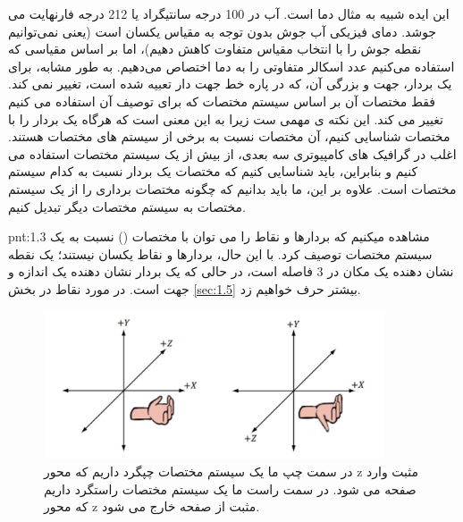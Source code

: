{\begin{spacing}{1.5}
        این ایده شبیه به مثال دما است. آب در 100 درجه سانتیگراد یا 212 درجه فارنهایت می جوشد.
        دمای فیزیکی آب جوش بدون توجه به مقیاس یکسان است (یعنی نمی‌توانیم نقطه جوش را با انتخاب مقیاس متفاوت کاهش دهیم)،
        اما بر اساس مقیاسی که استفاده می‌کنیم عدد اسکالر متفاوتی را به دما اختصاص می‌دهیم.
        به طور مشابه، برای یک بردار، جهت و بزرگی آن، که در پاره خط جهت دار تعبیه شده است، تغییر نمی کند.
        فقط مختصات آن بر اساس سیستم مختصات که برای توصیف آن استفاده می کنیم تغییر می کند.
        این نکته ی مهمی ست زیرا به این معنی است که هرگاه یک بردار را با مختصات شناسایی کنیم، آن مختصات نسبت به برخی از سیستم های مختصات هستند.
        اغلب در گرافیک های کامپیوتری سه بعدی، از بیش از یک سیستم مختصات استفاده می کنیم و بنابراین، باید شناسایی کنیم که مختصات یک بردار نسبت به کدام سیستم مختصات است.
        علاوه بر این، ما باید بدانیم که چگونه مختصات برداری را از یک سیستم مختصات به سیستم مختصات دیگر تبدیل کنیم.
        \textbf{\vspace{-10pt}}
        \begin{point}{pnt:1.3}
            \Large
            مشاهده میکنیم که بردارها و نقاط را می توان با مختصات () نسبت به یک سیستم مختصات توصیف کرد.
            با این حال، بردارها و نقاط یکسان نیستند؛ یک نقطه نشان دهنده یک مکان در 3 فاصله است، در حالی که یک بردار نشان دهنده یک اندازه و جهت است.
            در مورد نقاط در بخش \ref{sec:1.5} بیشتر حرف خواهیم زد.
        \end{point}
        \textbf{\vspace{-50pt}}
    \end{spacing}

    \begin{figure}[H]
        \centering
        \setlength{\belowcaptionskip}{-10pt}
        \includegraphics[width=0.9\textwidth]{Images/4/1/4.Session.1.1.5}
        \caption{در سمت چپ ما یک سیستم مختصات چپگرد داریم که محور z مثبت وارد صفحه می شود. در سمت راست ما یک سیستم مختصات راستگرد داریم که محور z مثبت از صفحه خارج می شود.}
        \label{fig:4.Session.1.1.5}
    \end{figure}
}

